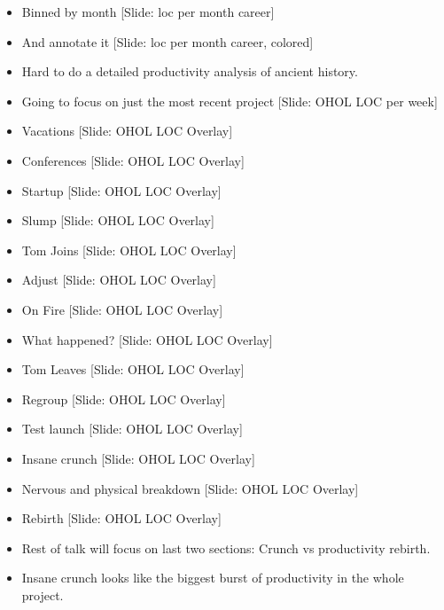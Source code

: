 \documentclass[12pt]{article}
\begin{document}
{\begin{itemize}
\item Binned by month  [Slide: loc per month career]

\item And annotate it  [Slide: loc per month career, colored]

\item Hard to do a detailed productivity analysis of ancient history.

\item Going to focus on just the most recent project [Slide:  OHOL LOC per week]

\item Vacations [Slide: OHOL LOC Overlay]

\item Conferences [Slide: OHOL LOC Overlay]

\item Startup [Slide: OHOL LOC Overlay]

\item Slump [Slide: OHOL LOC Overlay]

\item Tom Joins [Slide: OHOL LOC Overlay]

\item Adjust [Slide: OHOL LOC Overlay]

\item On Fire [Slide: OHOL LOC Overlay]

\item What happened? [Slide: OHOL LOC Overlay]

\item Tom Leaves [Slide: OHOL LOC Overlay]

\item Regroup [Slide: OHOL LOC Overlay]

\item Test launch [Slide: OHOL LOC Overlay]

\item Insane crunch [Slide: OHOL LOC Overlay]

\item Nervous and physical breakdown [Slide: OHOL LOC Overlay]

\item Rebirth [Slide: OHOL LOC Overlay]

\item Rest of talk will focus on last two sections:  Crunch vs productivity rebirth. 

\item Insane crunch looks like the biggest burst of productivity in the whole project.


\end{itemize}}
\end{document}
